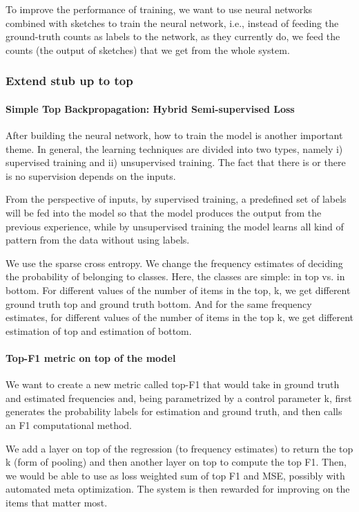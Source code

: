 To improve the performance of training, we want to use neural networks combined with sketches to train the neural network, i.e., instead of feeding the ground-truth counts as labels to the network, as they currently do, we feed the counts (the output of sketches) that we get from the whole system.


\subsubsection{Extend stub up to top}

\paragraph{Simple Top Backpropagation: Hybrid Semi-supervised Loss}

% 
After building the neural network, how to train the model is another important theme. In general, the learning techniques are divided into two types, namely i) supervised training and ii) unsupervised training. The fact that there is or there is no supervision depends on the inputs.

From the perspective of inputs, by supervised training, a predefined set of labels will be fed into the model so that the model produces the output from the previous experience, while by unsupervised training the model learns all kind of pattern from the data without using labels. 

We use the sparse cross entropy. We change the frequency estimates of deciding the probability of belonging to classes. Here, the classes are simple: in top vs. in bottom. For different values of the number of items in the top, k, we get different ground truth top and ground truth bottom. And for the same frequency estimates, for different values of the number of items in the top k, we get different estimation of top and estimation of bottom. 

\paragraph{Top-F1 metric on top of the model}

We want to create a new metric called top-F1 that would take in ground truth and estimated frequencies and, being parametrized by a control parameter k, first generates the probability labels for estimation and ground truth, and then calls an F1 computational method.

We add a layer on top of the regression (to frequency estimates) to return the top k (form of pooling) and then another layer on top to compute the top F1. Then, we would be able to use as loss weighted sum of top F1 and MSE, possibly with automated meta optimization. The system is then rewarded for improving on the items that matter most.



